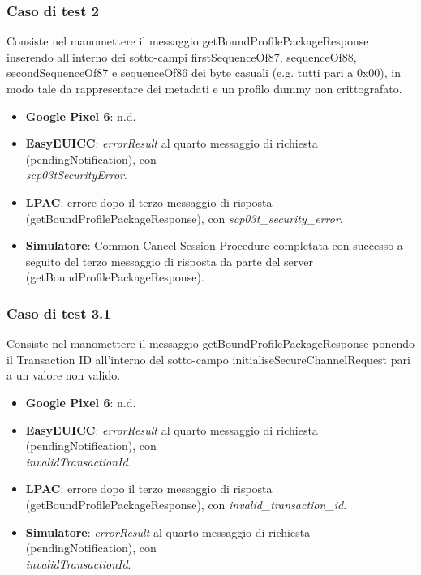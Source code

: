 \documentclass[10pt, oneside]{book}
\begin{document}
\subsubsection{Caso di test 2}
Consiste nel manomettere il messaggio getBoundProfilePackageResponse inserendo all'interno dei sotto-campi firstSequenceOf87, sequenceOf88, secondSequenceOf87 e sequenceOf86 dei byte casuali (e.g. tutti pari a 0x00), in modo tale da rappresentare dei metadati e un profilo dummy non crittografato.
\begin{itemize}
\item \textbf{Google Pixel 6}: n.d.
\item \textbf{EasyEUICC}: \textit{errorResult} al quarto messaggio di richiesta (pendingNotification), con\\ \textit{scp03tSecurityError}.
\item \textbf{LPAC}: errore dopo il terzo messaggio di risposta (getBoundProfilePackageResponse), con \textit{scp03t\_security\_error}.
\item \textbf{Simulatore}: Common Cancel Session Procedure completata con successo a seguito del terzo messaggio di risposta da parte del server (getBoundProfilePackageResponse).
\end{itemize}

\subsubsection{Caso di test 3.1}
Consiste nel manomettere il messaggio getBoundProfilePackageResponse ponendo il Transaction ID all'interno del sotto-campo initialiseSecureChannelRequest pari a un valore non valido.
\begin{itemize}
\item \textbf{Google Pixel 6}: n.d.
\item \textbf{EasyEUICC}: \textit{errorResult} al quarto messaggio di richiesta (pendingNotification), con\\ \textit{invalidTransactionId}.
\item \textbf{LPAC}: errore dopo il terzo messaggio di risposta (getBoundProfilePackageResponse), con \textit{invalid\_transaction\_id}.
\item \textbf{Simulatore}: \textit{errorResult} al quarto messaggio di richiesta (pendingNotification), con\\ \textit{invalidTransactionId}.
\end{itemize}
\end{document}
